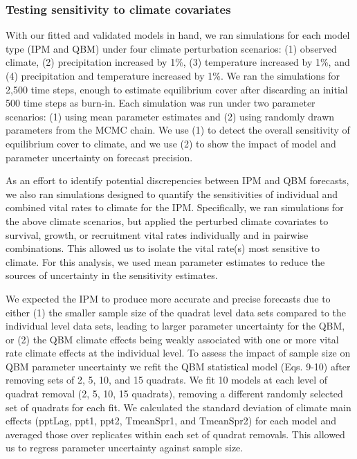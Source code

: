 \documentclass[12pt,]{article}
\begin{document}
\subsubsection{Testing sensitivity to climate
covariates}\label{testing-sensitivity-to-climate-covariates}

With our fitted and validated models in hand, we ran simulations for
each model type (IPM and QBM) under four climate perturbation scenarios:
(1) observed climate, (2) precipitation increased by 1\%, (3)
temperature increased by 1\%, and (4) precipitation and temperature
increased by 1\%. We ran the simulations for 2,500 time steps, enough to
estimate equilibrium cover after discarding an initial 500 time steps as
burn-in. Each simulation was run under two parameter scenarios: (1)
using mean parameter estimates and (2) using randomly drawn parameters
from the MCMC chain. We use (1) to detect the overall sensitivity of
equilibrium cover to climate, and we use (2) to show the impact of model
and parameter uncertainty on forecast precision.

As an effort to identify potential discrepencies between IPM and QBM
forecasts, we also ran simulations designed to quantify the
sensitivities of individual and combined vital rates to climate for the
IPM. Specifically, we ran simulations for the above climate scenarios,
but applied the perturbed climate covariates to survival, growth, or
recruitment vital rates individually and in pairwise combinations. This
allowed us to isolate the vital rate(s) most sensitive to climate. For
this analysis, we used mean parameter estimates to reduce the sources of
uncertainty in the sensitivity estimates.

We expected the IPM to produce more accurate and precise forecasts due
to either (1) the smaller sample size of the quadrat level data sets
compared to the individual level data sets, leading to larger parameter
uncertainty for the QBM, or (2) the QBM climate effects being weakly
associated with one or more vital rate climate effects at the individual
level. To assess the impact of sample size on QBM parameter uncertainty
we refit the QBM statistical model (Eqs. 9-10) after removing sets of 2,
5, 10, and 15 quadrats. We fit 10 models at each level of quadrat
removal (2, 5, 10, 15 quadrats), removing a different randomly selected
set of quadrats for each fit. We calculated the standard deviation of
climate main effects (pptLag, ppt1, ppt2, TmeanSpr1, and TmeanSpr2) for
each model and averaged those over replicates within each set of quadrat
removals. This allowed us to regress parameter uncertainty against
sample size.
\end{document}
